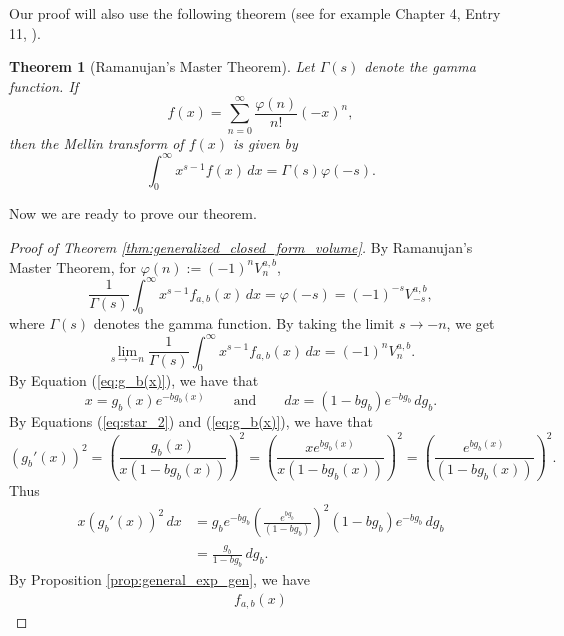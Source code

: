 \documentclass[11pt]{amsart}
\newtheorem{theorem}{Theorem}[section]
\theoremstyle{definition}
\newcommand{\0}{\emptyset}
\begin{document}
Our proof will also use the following theorem (see for example Chapter 4, Entry 11, \cite{Ram}).

\begin{theorem}[Ramanujan's Master Theorem]\label{thm:RMT} Let $\Gamma(s)$ denote the gamma function. If \begin{equation}\label{eq:RMT_f} f(x) = \sum_{n=0}^\infty \frac{\varphi(n)}{n!}(-x)^n,\end{equation}
then the Mellin transform of $f(x)$ is given by 
\begin{equation}\label{eq:RMT_mellin} \int_0^\infty x^{s-1} f(x) \, dx = \Gamma(s)\varphi(-s).\end{equation}
\end{theorem}

Now we are ready to prove our theorem.
\begin{proof}[Proof of Theorem \ref{thm:generalized_closed_form_volume}]
By Ramanujan's Master Theorem, for $\varphi(n) := (-1)^nV^{a,b}_n$,
\begin{equation}
    \frac{1}{\Gamma(s)}\int_0^\infty x^{s-1} f_{a,b}(x) \, dx = \varphi(-s) =(-1)^{-s} V^{a,b}_{-s}, \nonumber
\end{equation}
where $\Gamma(s)$ denotes the gamma function. By taking the limit $s \to -n$, we get 
\begin{equation}
    \lim_{s \to -n} \frac{1}{\Gamma(s)} \int_0^\infty x^{s-1} f_{a,b}(x) \, dx= (-1)^{n} V^{a,b}_{n}. \nonumber
\end{equation}
By Equation (\ref{eq:g_b(x)}), we have that
\begin{equation}\label{eq:newstar_1}
x=g_b(x)e^{-bg_b(x)} \qquad \text{and} \qquad dx = (1-bg_b )e^{-bg_b}\, dg_b.
\end{equation}
By Equations (\ref{eq:star_2}) and (\ref{eq:g_b(x)}), we have that 
\begin{equation}
    (g_b'(x))^2 = \left( \frac{g_b(x)}{x(1-bg_b(x))} \right)^2 = \left(\frac{xe^{bg_b(x)}}{x(1-bg_b(x))}\right)^2 = \left(\frac{e^{bg_b(x)}}{(1-bg_b(x))}\right)^2. \nonumber
\end{equation}
Thus
\begin{align*}
    x (g_b'(x))^2 \, dx &= g_be^{-bg_b} \left(\frac{e^{bg_b}}{(1-bg_b)}\right)^2 (1-bg_b )e^{-bg_b}\, dg_b\nonumber\\
    &= \frac{g_b}{1-bg_b}\, dg_b.
\end{align*}
By Proposition \ref{prop:general_exp_gen}, we have
\begin{align}\label{eq:newstar_2}
    f_{a,b}(x)

\end{align}
\end{proof}
\end{document}
